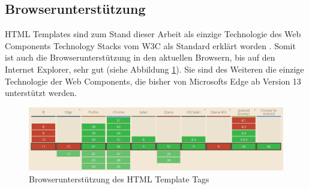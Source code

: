 \subsection{Browserunterstützung}\label{browserunterstuxfctzung}

HTML Templates sind zum Stand dieser Arbeit als einzige Technologie des Web Components Technology Stacks vom W3C als Standard erklärt worden \cite{citeulike:13853159}. Somit ist auch die Browserunterstützung in den aktuellen Browsern, bis auf den Internet Explorer, sehr gut (siehe Abbildung \ref{fig:bdhtmltt}). Sie sind des Weiteren die einzige Technologie der Web Components, die bisher von Microsofts Edge ab Version 13 unterstützt werden.

\begin{figure}[htbp]
 \centering
 \includegraphics[width=\linewidth]{kapitel2/bilder/4-html-templates-browserunterstuetzung}
 \caption{Browserunterstützung des HTML Template Tags}
 \label{fig:bdhtmltt}
\end{figure}
